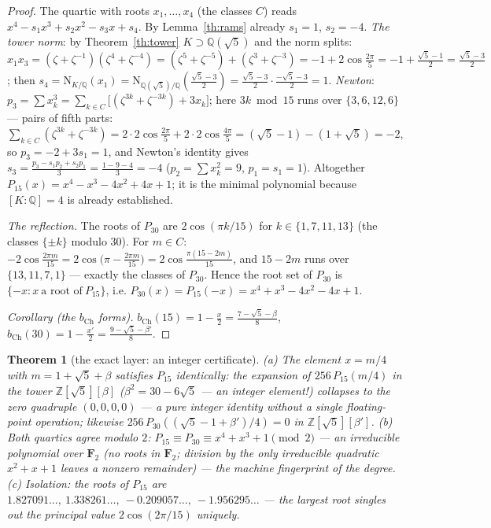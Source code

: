 \documentclass[11pt,a4paper]{article}
\theoremstyle{plain}
\newtheorem{theorem}{Theorem}
\theoremstyle{definition}
\theoremstyle{remark}
\newcommand{\ZZ}{\mathbb{Z}}
\newcommand{\QQ}{\mathbb{Q}}
\begin{document}
\begin{proof}
The quartic with roots $x_1,\dots,x_4$ (the classes $C$) reads
$x^4-s_1x^3+s_2x^2-s_3x+s_4$. By Lemma~\ref{th:rams} already
$s_1=1$, $s_2=-4$. \emph{The tower norm}: by
Theorem~\ref{th:tower} $K\supset\QQ(\sqrt5)$ and the norm splits:
$x_1x_3=(\zeta+\zeta^{-1})(\zeta^4+\zeta^{-4})
=(\zeta^5+\zeta^{-5})+(\zeta^3+\zeta^{-3})
=-1+2\cos\frac{2\pi}{5}=-1+\frac{\sqrt5-1}{2}=\frac{\sqrt5-3}{2}$;
then
$s_4=\mathrm{N}_{K/\QQ}(x_1)
=\mathrm{N}_{\QQ(\sqrt5)/\QQ}\!\left(\frac{\sqrt5-3}{2}\right)
=\frac{\sqrt5-3}{2}\cdot\frac{-\sqrt5-3}{2}=1$.
\emph{Newton}: $p_3=\sum x_k^3=\sum_{k\in C}\!\big[(\zeta^{3k}+\zeta^{-3k})+3x_k\big]$;
here $3k\bmod15$ runs over $\{3,6,12,6\}$ --- pairs of fifth
parts:
$\sum_{k\in C}(\zeta^{3k}+\zeta^{-3k})
=2\cdot2\cos\frac{2\pi}{5}+2\cdot2\cos\frac{4\pi}{5}
=(\sqrt5-1)-(1+\sqrt5)=-2$,
so $p_3=-2+3s_1=1$, and Newton's identity gives
$s_3=\frac{p_3-s_1p_2+s_2p_1}{3}=\frac{1-9-4}{3}=-4$
($p_2=\sum x_k^2=9$, $p_1=s_1=1$). Altogether
$P_{15}(x)=x^4-x^3-4x^2+4x+1$; it is the minimal polynomial
because $[K:\QQ]=4$ is already established.

\emph{The reflection.} The roots of $P_{30}$ are
$2\cos(\pi k/15)$ for $k\in\{1,7,11,13\}$ (the classes
$\{\pm k\}$ modulo $30$). For $m\in C$:
$-2\cos\frac{2\pi m}{15}=2\cos\!\big(\pi-\frac{2\pi m}{15}\big)
=2\cos\frac{\pi(15-2m)}{15}$, and $15-2m$ runs over
$\{13,11,7,1\}$ --- exactly the classes of $P_{30}$. Hence the
root set of $P_{30}$ is $\{-x\colon x\ \text{a root of}\ P_{15}\}$,
i.e. $P_{30}(x)=P_{15}(-x)=x^4+x^3-4x^2-4x+1$.

\emph{Corollary (the $b_{\mathrm{Ch}}$ forms).}
$b_{\mathrm{Ch}}(15)=1-\frac{x}{2}=\frac{7-\sqrt5-\beta}{8}$,
$b_{\mathrm{Ch}}(30)=1-\frac{x'}{2}=\frac{9-\sqrt5-\beta'}{8}$.
\end{proof}

\begin{theorem}[the exact layer: an integer certificate]\label{th:exact}
\emph{(a)} The element $x=m/4$ with $m=1+\sqrt5+\beta$ satisfies
$P_{15}$ identically: the expansion of $256\,P_{15}(m/4)$ in the
tower $\ZZ[\sqrt5][\beta]$ ($\beta^2=30-6\sqrt5$ --- an integer
element!) collapses to the zero quadruple $(0,0,0,0)$ --- a
\emph{pure integer identity} without a single floating-point
operation; likewise $256\,P_{30}((\sqrt5-1+\beta')/4)=0$ in
$\ZZ[\sqrt5][\beta']$. \emph{(b)} Both quartics agree modulo $2$:
$P_{15}\equiv P_{30}\equiv x^4+x^3+1\pmod2$ --- an irreducible
polynomial over $\mathbf{F}_2$ (no roots in $\mathbf{F}_2$;
division by the only irreducible quadratic $x^2+x+1$ leaves a
nonzero remainder) --- the machine fingerprint of the degree.
\emph{(c)} Isolation: the roots of $P_{15}$ are
$1.827091\ldots,\ 1.338261\ldots,\ -0.209057\ldots,\ -1.956295\ldots$
--- the largest root singles out the principal value
$2\cos(2\pi/15)$ uniquely.
\end{theorem}
\end{document}

